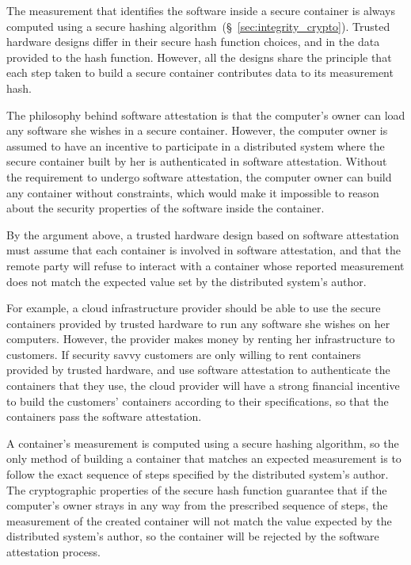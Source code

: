 \label{sec:generic_measurement}

The measurement that identifies the software inside a secure container is
always computed using a secure hashing
algorithm~(\S~\ref{sec:integrity_crypto}). Trusted hardware designs differ in
their secure hash function choices, and in the data provided to the hash
function. However, all the designs share the principle that each step taken to
build a secure container contributes data to its measurement hash.

The philosophy behind software attestation is that the computer's owner can
load any software she wishes in a secure container. However, the computer owner
is assumed to have an incentive to participate in a distributed system where
the secure container built by her is authenticated in software attestation.
Without the requirement to undergo software attestation, the computer owner can
build any container without constraints, which would make it impossible to
reason about the security properties of the software inside the container.

By the argument above, a trusted hardware design based on software attestation
must assume that each container is involved in software attestation, and that
the remote party will refuse to interact with a container whose reported
measurement does not match the expected value set by the distributed system's
author.

For example, a cloud infrastructure provider should be able to use the secure
containers provided by trusted hardware to run any software she wishes on her
computers. However, the provider makes money by renting her infrastructure to
customers. If security savvy customers are only willing to rent containers
provided by trusted hardware, and use software attestation to authenticate the
containers that they use, the cloud provider will have a strong financial
incentive to build the customers' containers according to their specifications,
so that the containers pass the software attestation.

A container's measurement is computed using a secure hashing algorithm, so the
only method of building a container that matches an expected measurement is to
follow the exact sequence of steps specified by the distributed system's
author. The cryptographic properties of the secure hash function guarantee that
if the computer's owner strays in any way from the prescribed sequence of
steps, the measurement of the created container will not match the value
expected by the distributed system's author, so the container will be rejected
by the software attestation process.

